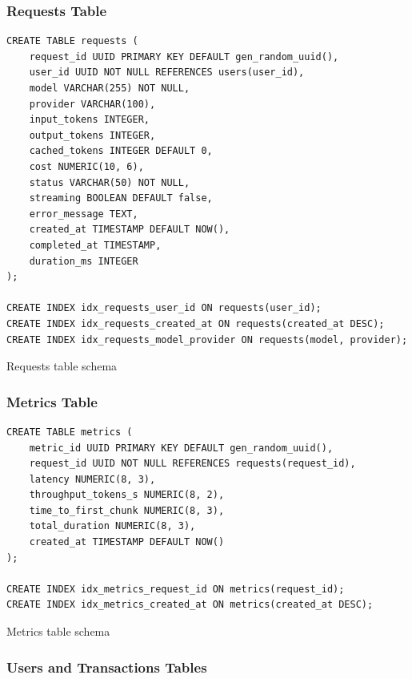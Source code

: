 \documentclass[english]{article}
\begin{document}
\subsubsection*{Requests Table}

\begin{listing}[H]
\begin{verbatim}
CREATE TABLE requests (
    request_id UUID PRIMARY KEY DEFAULT gen_random_uuid(),
    user_id UUID NOT NULL REFERENCES users(user_id),
    model VARCHAR(255) NOT NULL,
    provider VARCHAR(100),
    input_tokens INTEGER,
    output_tokens INTEGER,
    cached_tokens INTEGER DEFAULT 0,
    cost NUMERIC(10, 6),
    status VARCHAR(50) NOT NULL,
    streaming BOOLEAN DEFAULT false,
    error_message TEXT,
    created_at TIMESTAMP DEFAULT NOW(),
    completed_at TIMESTAMP,
    duration_ms INTEGER
);

CREATE INDEX idx_requests_user_id ON requests(user_id);
CREATE INDEX idx_requests_created_at ON requests(created_at DESC);
CREATE INDEX idx_requests_model_provider ON requests(model, provider);
\end{verbatim}
\caption{Requests table schema}
\end{listing}

\subsubsection*{Metrics Table}

\begin{listing}[H]
\begin{verbatim}
CREATE TABLE metrics (
    metric_id UUID PRIMARY KEY DEFAULT gen_random_uuid(),
    request_id UUID NOT NULL REFERENCES requests(request_id),
    latency NUMERIC(8, 3),
    throughput_tokens_s NUMERIC(8, 2),
    time_to_first_chunk NUMERIC(8, 3),
    total_duration NUMERIC(8, 3),
    created_at TIMESTAMP DEFAULT NOW()
);

CREATE INDEX idx_metrics_request_id ON metrics(request_id);
CREATE INDEX idx_metrics_created_at ON metrics(created_at DESC);
\end{verbatim}
\caption{Metrics table schema}
\end{listing}

\subsubsection*{Users and Transactions Tables}
\end{document}

